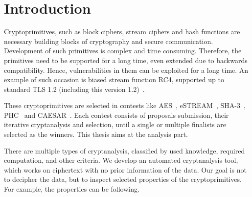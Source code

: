\documentclass[
  print, %
  Table,   %
  nolof,     %
  nolot,     %
  11pt, %
  oneside  %
]{fithesis3}
\begin{document}
\setlength{\parskip}{5pt}
\setlength{\parindent}{0pt}


\chapter{Introduction}
\label{chap:introduction}


Cryptoprimitives, such as block ciphers, stream ciphers and hash functions are necessary building blocks of cryptography and secure communication. Development of such primitives is complex and time consuming. Therefore, the primitives need to be supported for a long time, even extended due to backwards compatibility. Hence, vulnerabilities in them can be exploited for a long time. An example of such occasion is biased stream function RC4, supported up to standard TLS 1.2 (including this version 1.2)~\cite{dierks2008transport}.

These cryptoprimitives are selected in contests like AES~\cite{aes-competition}, eSTREAM~\cite{estream-competition}, SHA-3~\cite{sha3-competition}, PHC~\cite{password-hashing-competition} and CAESAR~\cite{caesar-competition}. Each contest consists of proposals submission, their iterative cryptanalysis and selection, until a single or multiple finalists are selected as the winners. This thesis aims at the analysis part.

There are multiple types of cryptanalysis, classified by used knowledge, required computation, and other criteria. We develop an automated cryptanalysis tool, which works on ciphertext with no prior information of the data. Our goal is not to decipher the data, but to inspect selected properties of the cryptoprimitives. For example, the properties can be following.
\end{document}
